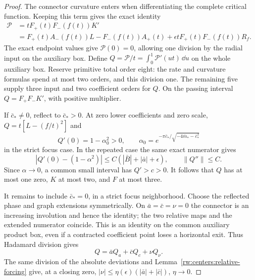 \begin{proof}
The connector curvature enters when differentiating the complete
critical function. Keeping this term gives the exact identity
\begin{equation}\label{rw:infinity:cubic-numerator}
\begin{split}
 \mathcal P&=tF_+(t)F_-(f(t))K'\\
 &=F_+(t)A_-(f(t))L-F_-(f(t))A_+(t)
        +\epsilon tF_+(t)F_-(f(t))R_f.
\end{split}
\end{equation}
The exact endpoint values give $\mathcal P(0)=0$, allowing one
division by the radial input on the auxiliary box. Define
$Q=\mathcal P/t=\int_0^1\mathcal P'(ut)\,\dd u$ on the whole
auxiliary box. Reserve primitive total order eight: the rate and
curvature formulas spend at most two orders, and this division one.
The remaining five supply three input and two coefficient orders for
$Q$. On the passing interval $Q=F_+F_-K'$, with positive multiplier.

If $\bar c_*\ne0$, reflect to $\bar c_*>0$. At zero lower
coefficients and zero scale,
$Q=t[L-(f/t)^2]$ and
\[
 Q'(0)=1-\alpha_0^2>0,\qquad
 \alpha_0=e^{-\pi\bar c_*/\sqrt{-4\bar m_*-\bar c_*^2}}
\]
in the strict focus case. In the repeated case the same exact
numerator gives
\[
 |Q'(0)-(1-\alpha^2)|\le C(|\bar B|+|\bar a|+\epsilon),
 \qquad \|Q''\|\le C.
\]
Since $\alpha\to0$, a common small interval has $Q'>c>0$.
It follows that $Q$ has at most one zero, $K$ at most two, and
$F$ at most three.

It remains to include $\bar c_*=0$, in a strict focus neighborhood.
Choose the reflected phase and graph extensions symmetrically. On
$\bar a=\bar c=\nu=0$ the connector is an increasing involution
and hence the identity; the two relative maps and the extended
numerator coincide. This is an identity on the common auxiliary
product box, even if a contracted coefficient point loses a horizontal
exit. Thus Hadamard division gives
\[
 Q=\bar a Q_a+\bar cQ_c+\nu Q_\nu.
\]
The same division of the absolute deviations and
Lemma~\ref{rw:centers:relative-forcing} give, at a closing zero,
$|\nu|\le\eta(\epsilon)(|\bar a|+|\bar c|)$, $\eta\to0$.


\end{proof}
